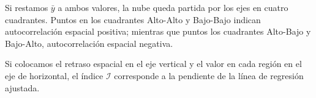Si restamos $\bar{y}$ a ambos valores, la nube queda partida por los ejes en cuatro cuadrantes. Puntos en los cuadrantes Alto-Alto y Bajo-Bajo indican autocorrelación espacial positiva; mientras que puntos los cuadrantes Alto-Bajo y Bajo-Alto, autocorrelación espacial negativa.

Si colocamos el retraso espacial en el eje vertical y el valor en cada región en el eje de horizontal, el índice $\mathcal{I}$ corresponde a la pendiente de la línea de regresión ajustada.



% 
% 
% 
% 
% 
